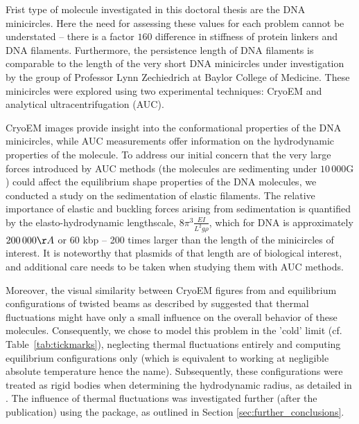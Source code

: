 \documentclass{doctoral}
\newcommand{\code}[1]{\texttt{\detokenize{#1}}}
\begin{document}
Frist type of molecule investigated in this doctoral thesis are the DNA minicircles.
Here the need for assessing these values for each problem cannot be understated -- there is a factor $160$ difference in stiffness of protein linkers and DNA filaments.
Furthermore, the persistence length of DNA filaments is comparable to the length of the very short DNA minicircles under investigation by the group of Professor Lynn Zechiedrich at Baylor College of Medicine.
These minicircles were explored using two experimental techniques: CryoEM\cite{Irobalieva_2015} and analytical ultracentrifugation (AUC)\cite{Waszkiewicz_2023_dna}.

CryoEM images provide insight into the conformational properties of the DNA minicircles, while AUC measurements offer information on the hydrodynamic properties of the molecule.
To address our initial concern that the very large forces introduced by AUC methods (the molecules are sedimenting under $10\,000\mathrm{G}$) could affect the equilibrium shape properties of the DNA molecules, we conducted a study on the sedimentation of elastic filaments\cite{Waszkiewicz_2021_stability}.
The relative importance of elastic and buckling forces arising from sedimentation is quantified by the elasto-hydrodynamic lengthscale, $8\pi^3 \frac{EI}{L^2 g\rho}$, which for DNA is approximately $200\,000 \AA{}$ or $60$ kbp -- 200 times larger than the length of the minicircles of interest.
It is noteworthy that plasmids of that length are of biological interest, and additional care needs to be taken when studying them with AUC methods.

Moreover, the visual similarity between CryoEM figures from \textcite{Irobalieva_2015} and equilibrium configurations of twisted beams as described by \textcite{Coleman_2000} suggested that thermal fluctuations might have only a small influence on the overall behavior of these molecules.
Consequently, we chose to model this problem in the 'cold' limit (cf.
Table~\ref{tab:tickmarks}), neglecting thermal fluctuations entirely and computing equilibrium configurations only (which is equivalent to working at negligible absolute temperature hence the name).
Subsequently, these configurations were treated as rigid bodies when determining the hydrodynamic radius, as detailed in \textcite{Waszkiewicz_2023_dna}.
The influence of thermal fluctuations was investigated further (after the publication) using the \code{pychastic} package, as outlined in Section \ref{sec:further_conclusions}.
\end{document}
